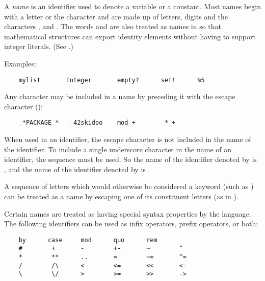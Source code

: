 
A {\em name\/} is an identifier used to denote a variable or a constant.
Most names begin with a letter or the character \ttin{\%} and are made up of
letters, digits and the characters \ttin{\%},  and \ttin{!}.
The words  and  are also treated as names in \asharp{}
so that mathematical structures can export identity elements without
having to support integer literals.  (See .)

Examples:

\begin{small}
\begin{verbatim}
    mylist       Integer       empty?      set!      %5
\end{verbatim}
\end{small}

Any character may be included in a name by preceding it with the
escape character (\ttin{\_}):

\begin{small}
\begin{verbatim}
    _*PACKAGE_*   _42skidoo    mod_+       _*_+
\end{verbatim}
\end{small}

When used in an identifier, the escape character is not included in the name
of the identifier.  To include a single underscore character in the name
of an identifier, the sequence \ttin{\_\_} must be used.  So the name of the
identifier denoted by  is , and the name of the
identifier denoted by  is .

A sequence of letters which would otherwise be considered a keyword
(such as ) can be treated as a name by escaping one of its
constituent letters (as in ).

Certain names are treated as having special syntax properties by the language.
The following identifiers can be used as infix operators, prefix operators,
or both:

\begin{verbatim}
    by      case     mod      quo      rem
    #        +       -        +-       ~        ^
    *        **      ..       =        ~=       ^=
    /        /\      <        <=       <<       <-
    \        \/      >        >=       >>       ->
\end{verbatim}

